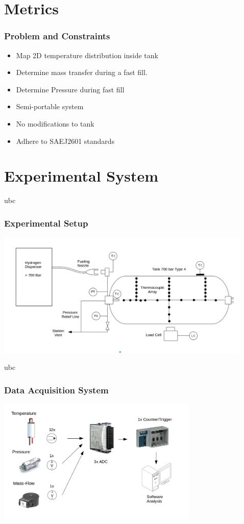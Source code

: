 \documentclass[10pt]{beamer}
\begin{document}
\section{Metrics}
\begin{frame}
\frametitle{Problem and Constraints}
\begin{itemize}

\item  Map 2D temperature distribution inside tank

\item Determine mass transfer during a fast fill.

\item  Determine Pressure during fast fill

\item  Semi-portable system

\item  No modifications to tank

\item  Adhere to SAEJ2601 standards

\end{itemize}
\end{frame}





\section{Experimental System}

\begin{frame}{ubc}
\frametitle{Experimental Setup}

\center\includegraphics[height=6cm]{schem2}
\end{frame}

\begin{frame}{ubc}
\frametitle{Data Acquisition System}

\center\includegraphics[height=6cm]{sch.png}
\end{frame}
\end{document}
